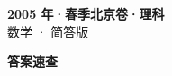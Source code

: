 \documentclass[zihao=-4, a4paper]{ctexart}
\begin{document}
\begin{center}
  {\Large\bfseries 2005 年·春季北京卷·理科}\\[4pt]
  {\large 数学 · 简答版}
\end{center}
\medskip
{}

\clearpage
{}
\begin{center}{\Large\bfseries 答案速查}\end{center}
\medskip

\end{document}
